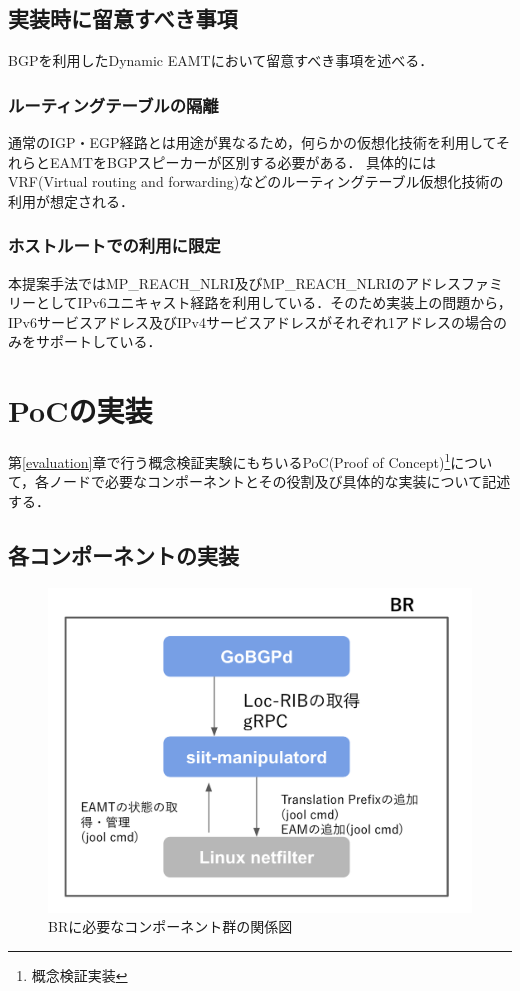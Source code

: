 \subsection{実装時に留意すべき事項}
BGPを利用したDynamic EAMTにおいて留意すべき事項を述べる．
\subsubsection{ルーティングテーブルの隔離}
通常のIGP・EGP経路とは用途が異なるため，何らかの仮想化技術を利用してそれらとEAMTをBGPスピーカーが区別する必要がある．
具体的にはVRF(Virtual routing and forwarding)などのルーティングテーブル仮想化技術の利用が想定される．

\subsubsection{ホストルートでの利用に限定}
本提案手法ではMP\_REACH\_NLRI及びMP\_REACH\_NLRIのアドレスファミリーとしてIPv6ユニキャスト経路を利用している．そのため実装上の問題から，IPv6サービスアドレス及びIPv4サービスアドレスがそれぞれ1アドレスの場合のみをサポートしている．


\section{PoCの実装}
\label{implementation:poc}
第\ref{evaluation}章で行う概念検証実験にもちいるPoC(Proof of Concept)\footnote{概念検証実装}について，各ノードで必要なコンポーネントとその役割及び具体的な実装について記述する．


\subsection{各コンポーネントの実装}
\label{implementation:poc:components}

\begin{figure}[]
    \begin{center}
    \includegraphics[width=12cm,pagebox=cropbox,clip]{img/poc_implementation.png}
    \end{center}
    \caption{BRに必要なコンポーネント群の関係図}
    \label{fig:poc_implementation}
\end{figure}


